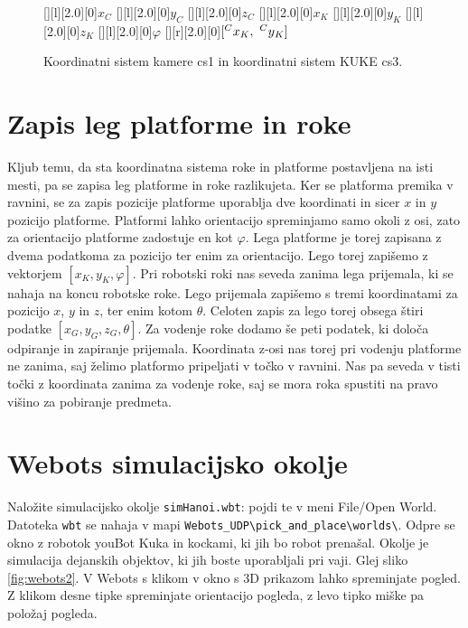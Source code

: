 \begin{figure}[h]
[][l][2.0][0]{$x_C$}
[][l][2.0][0]{$y_C$}
[][l][2.0][0]{$z_C$}
[][l][2.0][0]{\color{white}$x_K$}
[][l][2.0][0]{\color{white}$y_K$}
[][l][2.0][0]{\color{white}$z_K$}
[][l][2.0][0]{\color{white}$\varphi$}
\psfrag{[xK,yK]}[][r][2.0][0]{\color{white}$[\prescript{C}{}x_K,\,\,\prescript{C}{}y_K]$}
\centering {}
\caption{Koordinatni sistem kamere cs1 in koordinatni sistem KUKE cs3.}
\end{figure}

\section{Zapis leg platforme in roke}

Kljub temu, da sta koordinatna sistema roke in platforme postavljena na isti mesti, pa se zapisa leg platforme in roke razlikujeta. Ker se platforma premika v ravnini, se za zapis pozicije platforme uporablja dve koordinati in sicer $x$ in $y$ pozicijo platforme. Platformi lahko orientacijo spreminjamo samo okoli z osi, zato za orientacijo platforme zadostuje en kot $\varphi$. Lega platforme je torej zapisana z dvema podatkoma za pozicijo ter enim za orientacijo. Lego torej zapišemo z vektorjem $[x_K, y_K, \varphi]$.
Pri robotski roki nas seveda zanima lega prijemala, ki se nahaja na koncu robotske roke. Lego prijemala zapišemo s tremi koordinatami za pozicijo $x$, $y$ in $z$, ter enim kotom $\theta$. Celoten zapis za lego torej obsega štiri podatke $[x_G, y_G, z_G, \theta]$. Za vodenje roke dodamo še peti podatek, ki določa odpiranje in zapiranje prijemala.
Koordinata z-osi nas torej pri vodenju platforme ne zanima, saj želimo platformo pripeljati v točko v ravnini. Nas pa seveda v tisti točki z koordinata zanima za vodenje roke, saj se mora roka spustiti na pravo višino za pobiranje predmeta.

\section{Webots simulacijsko okolje}

Naložite simulacijsko okolje \verb|simHanoi.wbt|: pojdi te v meni File/Open World. Datoteka \verb|wbt| se nahaja v mapi \verb|Webots_UDP\pick_and_place\worlds\|. Odpre se okno z robotok youBot Kuka in kockami, ki jih bo robot prenašal. Okolje je simulacija dejanskih objektov, ki jih boste uporabljali pri vaji. Glej sliko \ref{fig:webots2}. V Webots s klikom v okno s 3D prikazom lahko spreminjate pogled. Z klikom desne tipke spreminjate orientacijo pogleda, z levo tipko miške pa položaj pogleda. 

